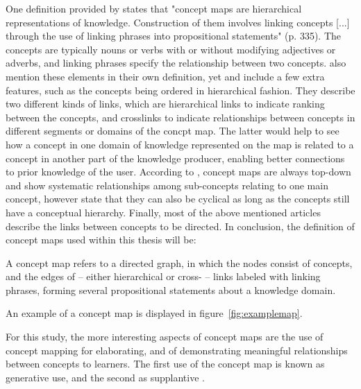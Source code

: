 One definition provided by  states that "concept maps are hierarchical representations of knowledge. Construction of them involves linking concepts [...] through the use of linking phrases into propositional statements" (p. 335). The concepts are typically nouns or verbs with or without modifying adjectives or adverbs, and linking phrases specify the relationship between two concepts.  also mention these elements in their own definition, yet  and  include a few extra features, such as the concepts being ordered in hierarchical fashion. They describe two different kinds of links, which are hierarchical links to indicate ranking between the concepts, and crosslinks to indicate relationships between concepts in different segments or domains of the concpt map. The latter would help to see how a concept in one domain of knowledge represented on the map is related to a concept in another part of the knowledge producer, enabling better connections to prior knowledge of the user. According to , concept maps are always top-down and show systematic relationships among sub-concepts relating to one main concept, however  state that they can also be cyclical as long as the concepts still have a conceptual hierarchy. Finally, most of the above mentioned articles describe the links between concepts to be directed. In conclusion, the definition of concept maps used within this thesis will be:

\begin{definition}
    A concept map refers to a directed graph, in which the nodes consist of concepts, and the edges of -- either hierarchical or cross- -- links labeled with linking phrases, forming several propositional statements about a knowledge domain.
\end{definition}

\noindent An example of a concept map is displayed in figure~\ref{fig:examplemap}.

For this study, the more interesting aspects of concept maps are the use of concept mapping for elaborating, and of demonstrating meaningful relationships between concepts to learners. The first use of the concept map is known as generative use, and the second as supplantive \cite{instructionaldesign}.

